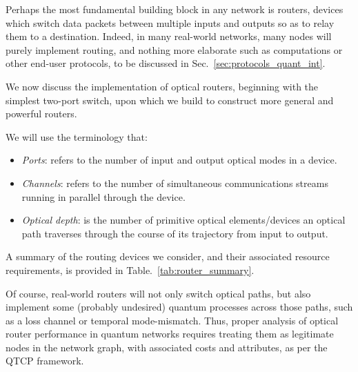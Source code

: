 \documentclass[aps, rmp, twocolumn, amsmath, amssymb, nofootinbib, superscriptaddress, longbibliography, floatfix, table-of-contents, eqsecnum]{revtex4-1}
\renewcommand{\tablename}{ALG.}
\begin{document}
Perhaps the most fundamental building block in any network is routers, devices which switch data packets between multiple inputs and outputs so as to relay them to a destination. Indeed, in many real-world networks, many nodes will purely implement routing, and nothing more elaborate such as computations or other end-user protocols, to be discussed in Sec.~\ref{sec:protocols_quant_int}.

We now discuss the implementation of optical routers, beginning with the simplest two-port switch, upon which we build to construct more general and powerful routers.

We will use the terminology that:
\begin{itemize}
	\item \textit{Ports}: refers to the number of input and output optical modes in a device.
	\item \textit{Channels}: refers to the number of simultaneous communications streams running in parallel through the device.
	\item \textit{Optical depth}: is the number of primitive optical elements/devices an optical path traverses through the course of its trajectory from input to output.
\end{itemize}

A summary of the routing devices we consider, and their associated resource requirements, is provided in Table.~\ref{tab:router_summary}.

Of course, real-world routers will not only switch optical paths, but also implement some (probably undesired) quantum processes across those paths, such as a loss channel or temporal mode-mismatch. Thus, proper analysis of optical router performance in quantum networks requires treating them as legitimate nodes in the network graph, with associated costs and attributes, as per the QTCP framework.

\renewcommand{\tablename}{TABLE}
\end{document}
